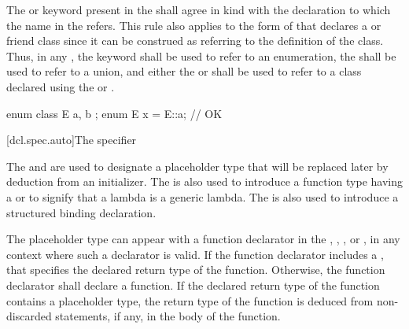 \pnum
The  or  keyword
present in the
 shall agree in kind with the
declaration to which the name in the
 refers. This rule also applies to
the form of  that declares a
 or friend class since it can be construed
as referring to the definition of the class. Thus, in any
, the  keyword
shall be
used to refer to an enumeration, the 
 shall be used to refer to a union,
and either the  or 
 shall be used to refer to a class
declared using the  or 
. \begin{example}

\begin{codeblock}
enum class E { a, b };
enum E x = E::a;                // OK
\end{codeblock}
\end{example}

[dcl.spec.auto]{The  specifier}%

\pnum
The  and  
are used to
designate a placeholder type that will be replaced later by deduction
from an initializer. The 
 is also used to
introduce a function type having a  or to
signify that a lambda is a generic lambda.
The   is also used to introduce a
structured binding declaration.

\pnum
The placeholder type can appear with a function declarator in the
, ,
, or ,
in any context where such a declarator is valid. If the function declarator
includes a , that
 specifies
the declared return type of the function. Otherwise, the function declarator
shall declare a function. If the declared return type of the
function contains a placeholder type, the return type of the function is
deduced from non-discarded  statements, if any, in the body
of the function.

